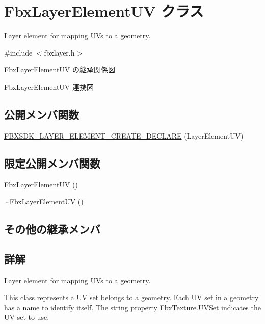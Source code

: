 \hypertarget{class_fbx_layer_element_u_v}{}\section{Fbx\+Layer\+Element\+UV クラス}
\label{class_fbx_layer_element_u_v}


Layer element for mapping U\+Vs to a geometry.  




{\ttfamily \#include $<$fbxlayer.\+h$>$}



Fbx\+Layer\+Element\+UV の継承関係図


Fbx\+Layer\+Element\+UV 連携図
\subsection*{公開メンバ関数}
\begin{DoxyCompactItemize}
\item 
\hyperlink{class_fbx_layer_element_u_v_a724a1f79f2ff129ca3be535db9de2245}{F\+B\+X\+S\+D\+K\+\_\+\+L\+A\+Y\+E\+R\+\_\+\+E\+L\+E\+M\+E\+N\+T\+\_\+\+C\+R\+E\+A\+T\+E\+\_\+\+D\+E\+C\+L\+A\+RE} (Layer\+Element\+UV)
\end{DoxyCompactItemize}
\subsection*{限定公開メンバ関数}
\begin{DoxyCompactItemize}
\item 
\hyperlink{class_fbx_layer_element_u_v_aaae1d6237b2f507a37344bc53f7667b0}{Fbx\+Layer\+Element\+UV} ()
\item 
\hyperlink{class_fbx_layer_element_u_v_a2906e0439687d1a8aa41b1f68c0990d7}{$\sim$\+Fbx\+Layer\+Element\+UV} ()
\end{DoxyCompactItemize}
\subsection*{その他の継承メンバ}


\subsection{詳解}
Layer element for mapping U\+Vs to a geometry. 

This class represents a UV set belongs to a geometry. Each UV set in a geometry has a name to identify itself. The string property \hyperlink{class_fbx_texture_ae28f2e1c33fa74ab1e9752f9de0be552}{Fbx\+Texture.\+U\+V\+Set} indicates the UV set to use.

